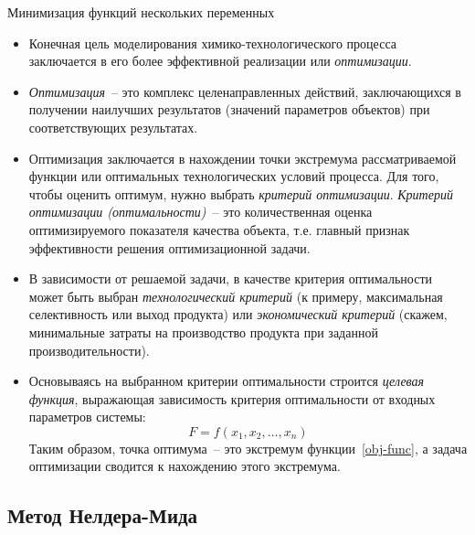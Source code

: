 \documentclass[aspectratio=169, mathserif]{beamer}	%
\begin{document}
\begin{frame}[fragile]{Минимизация функций нескольких переменных}
\scriptsize
\begin{itemize}
	\item Конечная цель моделирования химико-технологического процесса заключается в его более эффективной реализации или \textit{оптимизации}.

	\item \textit{Оптимизация}~-- это комплекс целенаправленных действий, заключающихся в получении наилучших результатов (значений параметров объектов) при соответствующих результатах.

	\item Оптимизация заключается в нахождении точки экстремума рассматриваемой функции или оптимальных технологических условий процесса. Для того, чтобы оценить оптимум, нужно выбрать \textit{критерий оптимизации}. \textit{Критерий оптимизации (оптимальности)}~-- это количественная оценка оптимизируемого показателя качества объекта, т.е. главный признак эффективности решения оптимизационной задачи.

	\item В зависимости от решаемой задачи, в качестве критерия оптимальности может быть выбран \textit{технологический критерий} (к примеру, максимальная селективность или выход продукта) или \textit{экономический критерий} (скажем, минимальные затраты на производство продукта при заданной производительности).

	\item Основываясь на выбранном критерии оптимальности строится \textit{целевая функция}, выражающая зависимость критерия оптимальности от входных параметров системы:
	\begin{equation}\label{obj-func}
		F = f(x_1, x_2, \ldots, x_n)
	\end{equation}
	Таким образом, точка оптимума~-- это экстремум функции~\eqref{obj-func}, а задача оптимизации сводится к нахождению этого экстремума.
\end{itemize}
\vfill
\end{frame}


\subsection{Метод Нелдера-Мида}
\end{document}
